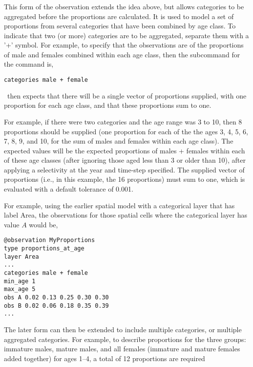 {{{{\subsubsection*{}

This form of the observation extends the idea above, but allows categories to be aggregated before the proportions are calculated. It is used to model a set of proportions from several categories that have been combined by age class. To indicate that two (or more) categories are to be aggregated, separate them with a '+' symbol. For example, to specify that the observations are of the proportions of male and females combined within each age class, then the subcommand  for the  command is,

{\small{\begin{verbatim}
categories male + female
\end{verbatim}}}

\SPM\ then expects that there will be a single vector of proportions supplied, with one proportion for each age class, and that these proportions sum to one. 

For example, if there were two categories and the age range was 3 to 10, then 8 proportions should be supplied (one proportion for each of the the ages 3, 4, 5, 6, 7, 8, 9, and 10, for the sum of males and females within each age class). The expected values will be the expected proportions of males + females within each of these age classes (after ignoring those aged less than 3 or older than 10), after applying a selectivity at the year and time-step specified. The supplied vector of proportions (i.e., in this example, the 16 proportions) must sum to one, which is evaluated with a default tolerance of 0.001. 

For example, using the earlier spatial model with a categorical layer that has label Area, the observations for those spatial cells where the categorical layer has value $A$ would be, 

{\small{\begin{verbatim}
@observation MyProportions
type proportions_at_age
layer Area
...
categories male + female
min_age 1
max_age 5
obs A 0.02 0.13 0.25 0.30 0.30
obs B 0.02 0.06 0.18 0.35 0.39
...
\end{verbatim}

The later form can then be extended to include multiple categories, or multiple aggregated categories. For example, to describe proportions for the three groups: immature males, mature males, and all females (immature and mature females added together) for ages 1--4, a total of 12 proportions are required 

}}}}}}
